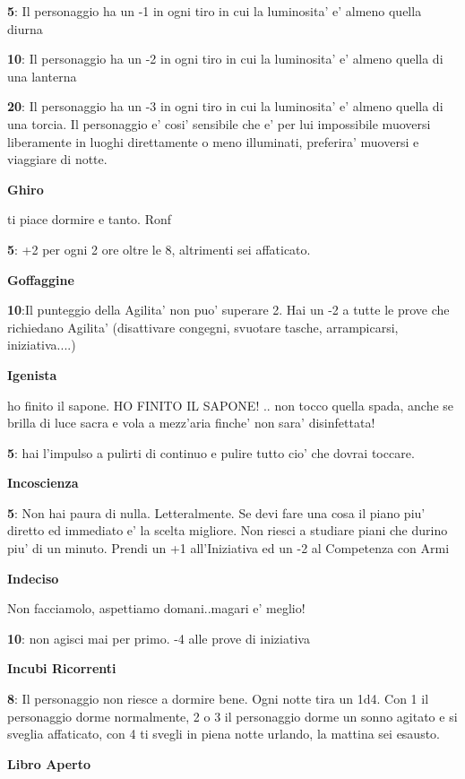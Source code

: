 \documentclass[a4paper,11pt,twoside,openany]{book}
\begin{document}
{\textbf{5}: Il personaggio ha un -1 in ogni tiro in cui la luminosita' e' almeno quella diurna

\textbf{10}: Il personaggio ha un -2 in ogni tiro in cui la luminosita' e' almeno quella di una lanterna

\textbf{20}: Il personaggio ha un -3 in ogni tiro in cui la luminosita' e' almeno quella di una torcia. Il personaggio e' cosi' sensibile che e' per lui impossibile muoversi liberamente in luoghi direttamente o meno illuminati, preferira' muoversi e viaggiare di notte.

\textbf{Ghiro}

ti piace dormire e tanto. Ronf

\textbf{5}: +2 per ogni 2 ore oltre le 8, altrimenti sei affaticato.

\textbf{Goffaggine}

\textbf{10}:Il punteggio della Agilita' non puo' superare 2. Hai un -2 a tutte le prove che richiedano Agilita' (disattivare congegni, svuotare tasche, arrampicarsi, iniziativa....) 

\textbf{Igenista}

ho finito il sapone. HO FINITO IL SAPONE! .. non tocco quella spada, anche se brilla di luce sacra e vola a mezz'aria finche' non sara' disinfettata!

\textbf{5}: hai l'impulso a pulirti di continuo e pulire tutto cio' che dovrai toccare.

\textbf{Incoscienza}

\textbf{5}: Non hai paura di nulla. Letteralmente. Se devi fare una cosa il piano piu' diretto ed immediato e' la scelta migliore. Non riesci a studiare piani che durino piu' di un minuto. Prendi un +1 all'Iniziativa ed un -2 al Competenza con Armi

\textbf{Indeciso}

Non facciamolo, aspettiamo domani..magari e' meglio!

\textbf{10}: non agisci mai per primo. -4 alle prove di iniziativa

\textbf{Incubi Ricorrenti}

\textbf{8}: Il personaggio non riesce a dormire bene. Ogni notte tira un 1d4. Con 1 il personaggio dorme normalmente, 2 o 3 il personaggio dorme un sonno agitato e si sveglia affaticato, con 4 ti svegli in piena notte urlando, la mattina sei esausto.

\textbf{Libro Aperto}

}
\end{document}
